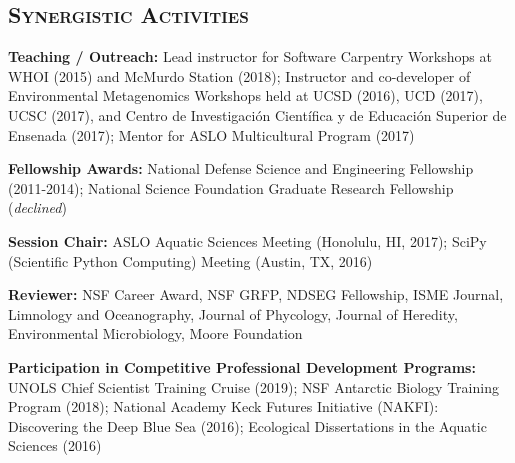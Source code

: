 \documentclass[svgnames,11ptm, a4paper]{article}
\begin{document}


\subsection*{\textsc{Synergistic Activities}}

\begin{bibenum}[itemsep=4pt]

    \item \textbf{Teaching / Outreach:} Lead instructor for Software Carpentry Workshops at WHOI (2015) and McMurdo Station (2018); Instructor and co-developer of Environmental Metagenomics Workshops held at UCSD (2016), UCD (2017), UCSC (2017), and Centro de Investigaci\'{o}n Cient\'{i}fica y de Educaci\'{o}n Superior de Ensenada (2017); Mentor for ASLO Multicultural Program (2017)

    \item \textbf{Fellowship Awards:} National Defense Science and Engineering Fellowship (2011-2014); National Science Foundation Graduate Research Fellowship (\textit{declined})

    \item \textbf{Session Chair:} ASLO Aquatic Sciences Meeting (Honolulu, HI, 2017); SciPy (Scientific Python Computing) Meeting (Austin, TX, 2016)

    \item \textbf{Reviewer:} NSF Career Award, NSF GRFP, NDSEG Fellowship, ISME Journal, Limnology and Oceanography, Journal of Phycology, Journal of Heredity, Environmental Microbiology, Moore Foundation

    \item \textbf{Participation in Competitive Professional Development Programs:}  UNOLS Chief Scientist Training Cruise (2019); NSF Antarctic Biology Training Program (2018); National Academy Keck Futures Initiative (NAKFI): Discovering the Deep Blue Sea (2016);  Ecological Dissertations in the Aquatic Sciences (2016)

\end{bibenum}

%
%
%
\end{document}
